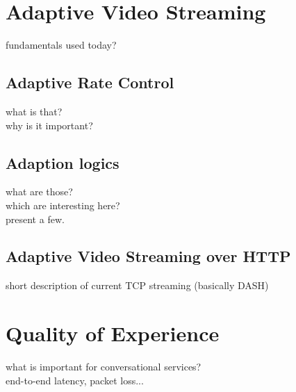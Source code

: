 \section{Adaptive Video Streaming}
fundamentals used today?

\subsection{Adaptive Rate Control}
what is that? \\
why is it important?

\subsection{Adaption logics}
what are those? \\
which are interesting here? \\
present a few.

\subsection{Adaptive Video Streaming over HTTP}
short description of current TCP streaming (basically DASH)

\section{Quality of Experience}
what is important for conversational services? \\
end-to-end latency, packet loss...

